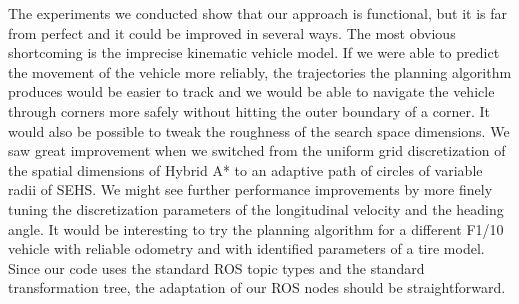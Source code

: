 The experiments we conducted show that our approach is functional, but it is far from perfect and it could be improved in several ways. The most obvious shortcoming is the imprecise kinematic vehicle model. If we were able to predict the movement of the vehicle more reliably, the trajectories the planning algorithm produces would be easier to track and we would be able to navigate the vehicle through corners more safely without hitting the outer boundary of a corner. It would also be possible to tweak the roughness of the search space dimensions. We saw great improvement when we switched from the uniform grid discretization of the spatial dimensions of Hybrid A* to an adaptive path of circles of variable radii of \gls*{SEHS}. We might see further performance improvements by more finely tuning the discretization parameters of the longitudinal velocity and the heading angle. It would be interesting to try the planning algorithm for a different F1/10 vehicle with reliable odometry and with identified parameters of a tire model. Since our code uses the standard \gls*{ROS} topic types and the standard transformation tree, the adaptation of our \gls*{ROS} nodes should be straightforward.